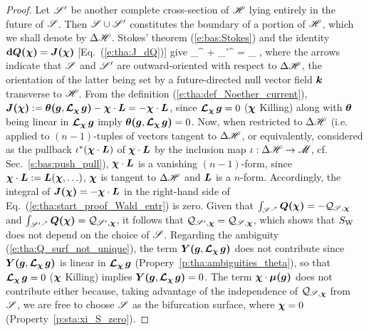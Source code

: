 \begin{proof}
Let $\mathscr{S}'$ be another complete cross-section of $\mathscr{H}$ lying entirely in the future of $\mathscr{S}$.
Then $\mathscr{S}\cup\mathscr{S}'$ constitutes the boundary of a portion of $\mathscr{H}$, which we shall denote by
$\Delta\mathscr{H}$. Stokes' theorem (\ref{e:bas:Stokes}) and the identity
$\mathbf{d} \bm{Q}\textbf{(}\bm{\chi}\textbf{)} = \bm{J}\textbf{(}\bm{\chi}\textbf{)}$ [Eq.~(\ref{e:tha:J_dQ})] give
\be \label{e:tha:start_proof_Wald_entr}
    \int_{\Sp^\nearrow} \lld\w{\chi}\rld +  \int_{{\Sp'}^\nearrow} \lld\w{\chi}\rld
    = \int_{\Delta\Hor} \lld\w{\chi}\rld ,
\ee
where the arrows indicate that $\mathscr{S}$ and  $\mathscr{S}'$
are outward-oriented with respect to $\Delta\mathscr{H}$, the orientation of the latter
being set by a future-directed null vector field $\bm{k}$ transverse to $\mathscr{H}$.
From the definition (\ref{e:tha:def_Noether_current}),
$\bm{J}\textbf{(}\bm{\chi}\textbf{)} := \bm{\theta}\textbf{(}\bm{g},\bm{\mathcal{L}}_{\bm{\chi}}\,\bm{g}\textbf{)} - \bm{\chi}\cdot\bm{L}
= - \bm{\chi}\cdot\bm{L}$, since $\bm{\mathcal{L}}_{\bm{\chi}}\,\bm{g}=0$ ($\bm{\chi}$ Killing)
along with $\bm{\theta}$ being linear in $\bm{\mathcal{L}}_{\bm{\chi}}\,\bm{g}$ imply $\bm{\theta}\textbf{(}\bm{g},\bm{\mathcal{L}}_{\bm{\chi}}\,\bm{g}\textbf{)} =0$.
Now, when restricted to $\Delta\mathscr{H}$ (i.e. applied to $(n-1)$-tuples of vectors tangent to $\Delta\mathscr{H}$,
or equivalently, considered as the pullback $\iota^*(\bm{\chi}\cdot\bm{L})$ of
$\bm{\chi}\cdot\bm{L}$ by the inclusion map $\iota: \Delta\mathscr{H} \to \mathscr{M}$, cf. Sec.~\ref{s:bas:push_pull}),
$\bm{\chi}\cdot\bm{L}$ is a vanishing $(n-1)$-form, since $\bm{\chi}\cdot\bm{L} := \bm{L}(\bm{\chi},\ldots)$,
$\bm{\chi}$ is tangent to $\Delta\mathscr{H}$ and $\bm{L}$ is a $n$-form.
Accordingly, the integral of $\bm{J}\textbf{(}\bm{\chi}\textbf{)} = - \bm{\chi}\cdot\bm{L}$ in the right-hand side of Eq.~(\ref{e:tha:start_proof_Wald_entr}) is zero. Given that
$ \int_{\mathscr{S}^\nearrow} \bm{Q}\textbf{(}\bm{\chi}\textbf{)} = -  \mathcal{Q}_{\mathscr{S},\bm{\chi}}$ and
$ \int_{{\mathscr{S}'}^\nearrow} \bm{Q}\textbf{(}\bm{\chi}\textbf{)} =  \mathcal{Q}_{\mathscr{S}',\bm{\chi}}$,
it follows that $\mathcal{Q}_{\mathscr{S}',\bm{\chi}} = \mathcal{Q}_{\mathscr{S},\bm{\chi}}$,
which shows that $S_{\rm W}$ does not depend on the choice of $\mathscr{S}$.
Regarding the ambiguity (\ref{e:tha:Q_surf_not_unique}), the term $\bm{Y}\textbf{(}\bm{g},\bm{\mathcal{L}}_{\bm{\chi}}\,\bm{g}\textbf{)}$
does not contribute since
$\bm{Y}\textbf{(}\bm{g},\bm{\mathcal{L}}_{\bm{\chi}}\,\bm{g}\textbf{)}$ is linear in $\bm{\mathcal{L}}_{\bm{\chi}}\,\bm{g}$ (Propery~\ref{p:tha:ambiguities_theta}),
so that $\bm{\mathcal{L}}_{\bm{\chi}}\,\bm{g} = 0$ ($\bm{\chi}$ Killing) implies $\bm{Y}\textbf{(}\bm{g},\bm{\mathcal{L}}_{\bm{\chi}}\,\bm{g}\textbf{)}=0$.
The term $\bm{\chi}\cdot\bm{\mu}\textbf{(}\bm{g}\textbf{)}$ does not contribute either because, taking advantage of the independence of
$\mathcal{Q}_{\mathscr{S},\bm{\chi}}$ from $\mathscr{S}$, we are free to choose $\mathscr{S}$ as the bifurcation surface, where
$\bm{\chi} = 0$ (Property~\ref{p:sta:xi_S_zero}).
\end{proof}


